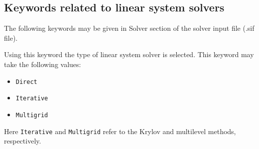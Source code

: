 \begin{versiona}
%





\section{Keywords related to linear system solvers}

\end{versiona}

The following keywords may be given in Solver section of the solver input file (.sif file).

\sifbegin
{}
Using this keyword the type of linear system solver is selected. This keyword may take  
the following values:
\begin{itemize}
\item {\tt Direct}
\item {\tt Iterative}
\item {\tt Multigrid}
\end{itemize}
Here {\tt Iterative} and {\tt Multigrid} refer to the Krylov 
and multilevel methods,
respectively.   

